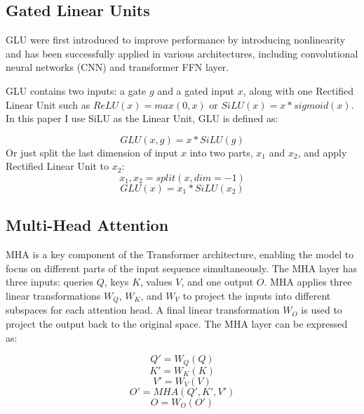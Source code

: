 \documentclass[11pt]{article}
\begin{document}
\subsection{Gated Linear Units}

GLU were first introduced to improve performance by introducing nonlinearity and has been successfully applied in various architectures, including convolutional neural networks (CNN)\cite{dauphin2017languagemodelinggatedconvolutional} and transformer FFN layer\cite{shazeer2020gluvariantsimprovetransformer}.

GLU contains two inputs: a gate $g$ and a gated input $x$, along with one Rectified Linear Unit\cite{fukushima1975relu} such as $ReLU(x)=max(0,x)$ or $SiLU(x)=x*sigmoid(x)$. In this paper I use SiLU\cite{elfwing2017sigmoidweightedlinearunitsneural} as the Linear Unit, GLU is defined as:


\begin{equation}
GLU(x,g) = x*SiLU(g)
\end{equation}
Or just split the last dimension of input $x$ into two parts, $x_1$ and $x_2$, and apply Rectified Linear Unit to $x_2$:
\begin{equation}
x_1, x_2 = split(x,dim=-1)
\end{equation}
\begin{equation}
GLU(x) = x_1 * SiLU(x_2)
\label{eq:glu}
\end{equation}

\subsection{Multi-Head Attention}

MHA is a key component of the Transformer architecture, enabling the model to focus on different parts of the input sequence simultaneously. The MHA layer has three inputs: queries $Q$, keys $K$, values $V$, and one output $O$. MHA applies three linear transformations $W_Q$, $W_K$, and $W_V$ to project the inputs into different subspaces for each attention head. A final linear transformation $W_O$ is used to project the output back to the original space. The MHA layer can be expressed as:

\begin{equation}
Q' = W_Q(Q)
\end{equation}
\begin{equation}
K' = W_K(K)
\end{equation}
\begin{equation}
V' = W_V(V)
\label{eq:mha_v}
\end{equation}
\begin{equation}
O' = MHA(Q', K', V')
\end{equation}
\begin{equation}
O = W_O(O')
\end{equation}
\end{document}
